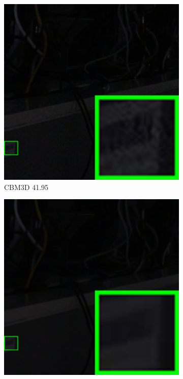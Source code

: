\begin{figure}
\begin{subfigure}[t]{0.19\textwidth}
        \includegraphics[width=1\textwidth]{images/guided/our/resize_br_CBM3D_SONY_A7II_ISO6400_DSC03017_part5.png}
		\caption{CBM3D 41.95}
    \end{subfigure}
    \hfill
    \begin{subfigure}[t]{0.19\textwidth}
        \centering
        \includegraphics[width=1\textwidth]{images/guided/our/resize_br_WNNM_SONY_A7II_ISO6400_DSC03017_part5.png}

\end{subfigure}
\end{figure}
